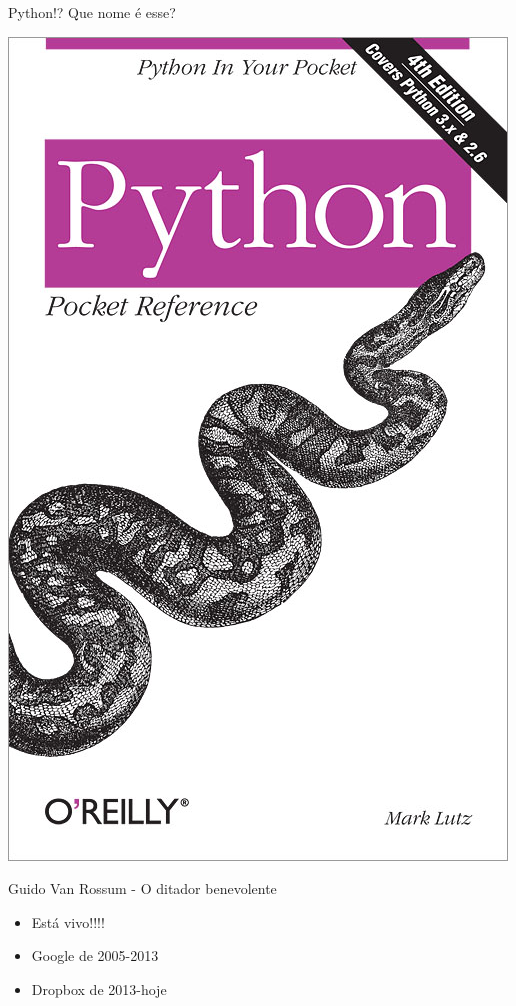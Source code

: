 \begin{frame}{Python!? Que nome é esse? }
\begin{center}
	\includegraphics[scale=1.0]{img/python_book.jpg}
\end{center}
\end{frame}

\begin{frame}{Guido Van Rossum - O ditador benevolente}
\begin{itemize}
	\item Está vivo!!!!
	\item Google de 2005-2013
	\item Dropbox de 2013-hoje
\end{itemize}
\end{frame}

